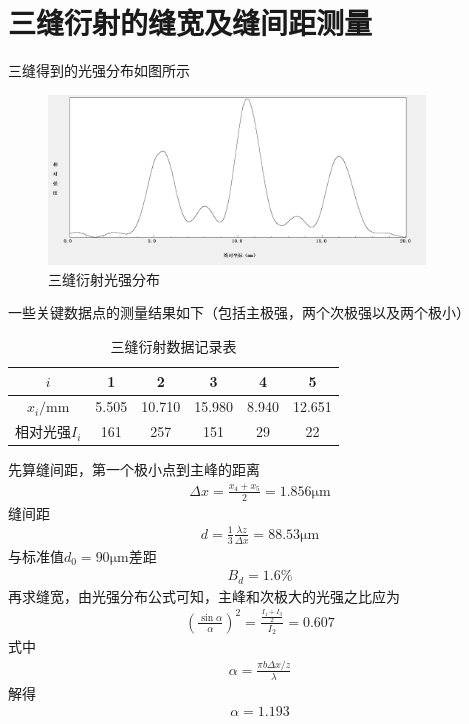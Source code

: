 \documentclass[a4paper]{ctexart}
\begin{document}
	\section{三缝衍射的缝宽及缝间距测量}
	三缝得到的光强分布如图所示
	\begin{figure}[H]
		\centering
		\includegraphics[width=10cm]{sanfeng.jpg}
		\caption{三缝衍射光强分布}
	\end{figure}
	一些关键数据点的测量结果如下（包括主极强，两个次极强以及两个极小）
	\begin{table}[H]
		\label{table}
		\begin{center}
			\caption{三缝衍射数据记录表}
			\begin{tabular}{c|ccccc}
				$i$&1&2&3&4&5\\
				\hline
				$x_i/\mathrm{mm}$&5.505&10.710&15.980&8.940&12.651\\
				\hline
				相对光强$I_i$&161&257&151&29&22
			\end{tabular}
		\end{center}
	\end{table}
	先算缝间距，第一个极小点到主峰的距离
	\begin{align}
		\Delta x=\frac{x_4+x_5}{2}=1.856\mathrm{\mu m}
	\end{align}
	缝间距
	\begin{align}
		d=\frac{1}{3}\frac{\lambda z}{\Delta x}=88.53\mathrm{\mu m}
	\end{align}
	与标准值$d_0=90\mathrm{\mu m}$差距
	\begin{align}
		B_d=1.6\%
	\end{align}
	再求缝宽，由光强分布公式可知，主峰和次极大的光强之比应为
	\begin{align}
		\left(\frac{\sin {\alpha}}{\alpha}\right)^2=\frac{\frac{I_1+I_3}{2}}{I_2}=0.607
	\end{align}
	式中
	\begin{align}
		\alpha=\frac{\pi b \Delta x/z}{\lambda}
	\end{align}
	解得
	\begin{align}
		\alpha=1.193
	\end{align}
\end{document}
